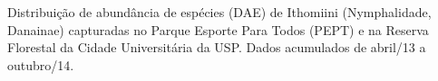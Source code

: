 Distribuição de abundância de espécies (DAE) de Ithomiini (Nymphalidade, Danainae) capturadas no Parque Esporte Para Todos (PEPT) e na Reserva Florestal da Cidade Universitária da USP. Dados acumulados de abril/13 a outubro/14. \label{fig:2.1.2}




